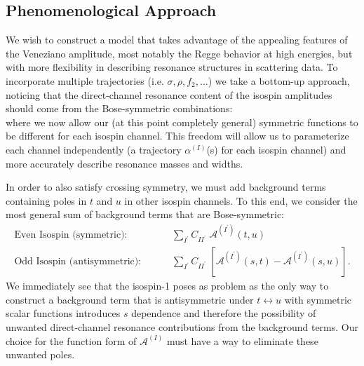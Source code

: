 \documentclass[aps,prd,amsmath,amssymb,superscriptaddress,onecolumn,
nofootinbib,showpacs,preprintnumbers]{revtex4-1}
\newcommand{\ma}{\mathcal{A}}
\newcommand{\maI}[1]{\mathcal{A}^{(#1)}}
\begin{document}
\subsection{Phenomenological Approach}
We wish to construct a model that takes advantage of the appealing features of the Veneziano amplitude, most notably the Regge behavior at high energies, but with more flexibility in describing resonance structures in scattering data. 
To incorporate multiple trajectories (i.e. $\sigma, \rho, f_2, ...$) we take a bottom-up approach, noticing that the direct-channel resonance content of the isospin amplitudes should come from the Bose-symmetric combinations:
	\begin{equation}
		[ \ma^{(I)}(s,t) + (-1)^I \ma^{(I)}(s,u) ] 
		\label{direct}
	\end{equation}
where we now allow our (at this point completely general) symmetric functions to be different for each isospin channel. This freedom will allow us to parameterize each channel independently (a trajectory $\alpha^{(I)}$(s) for each isospin channel) and more accurately describe resonance masses and widths. 

In order to also satisfy crossing symmetry, we must add background terms containing poles in $t$ and $u$ in other isospin channels. To this end, we consider the most general sum of background terms that are Bose-symmetric:
	\begin{align}
		\text{Even Isospin (symmetric): }& \qquad \sum_{I^\prime} C_{II^\prime} \; \ma^{(I^\prime)}(t,u) \nonumber \\
		\text{Odd Isospin (antisymmetric): }& \qquad \sum_{I^\prime} C_{II^\prime} \; [ \ma^{(I^\prime)}(s,t) - \ma^{(I^\prime)}(s,u) ].
		\label{background}
		\end{align}
We immediately see that the isospin-1 poses as problem as the only way to construct a background term that is antisymmetric under $t \leftrightarrow u$ with symmetric scalar functions introduces $s$ dependence and therefore the possibility of unwanted direct-channel resonance contributions from the background terms. Our choice for the function form of $\maI{I}$ must have a way to eliminate these unwanted poles.
\end{document}
